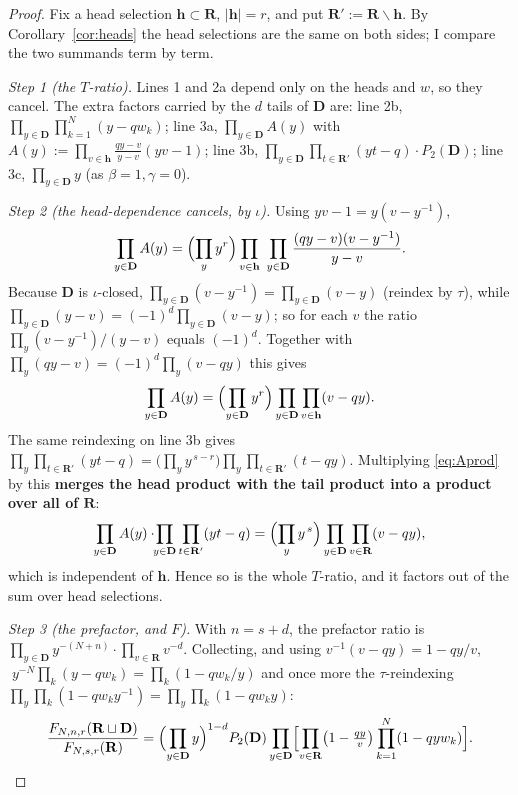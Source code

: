 \documentclass[11pt]{article}
\theoremstyle{definition}
\newcommand{\bD}{\mathbf{D}}
\newcommand{\bR}{\mathbf{R}}
\newcommand{\sm}{\smallsetminus}
\begin{document}
\begin{proof}
Fix a head selection $\mathbf h\subset\bR$, $|\mathbf h|=r$, and put
$\bR':=\bR\sm\mathbf h$.  By Corollary~\ref{cor:heads} the head selections are the
same on both sides; I compare the two summands term by term.

\emph{Step 1 (the $T$-ratio).}  Lines 1 and 2a depend only on the heads and $w$,
so they cancel.  The extra factors carried by the $d$ tails of $\bD$ are:
line 2b, $\prod_{y\in\bD}\prod_{k=1}^{N}(y-qw_k)$;
line 3a, $\prod_{y\in\bD}A(y)$ with
$A(y):=\prod_{v\in\mathbf h}\frac{qy-v}{y-v}(yv-1)$;
line 3b, $\prod_{y\in\bD}\prod_{t\in\bR'}(yt-q)\cdot P_2(\bD)$;
line 3c, $\prod_{y\in\bD}y$ (as $\beta=1,\gamma=0$).

\emph{Step 2 (the head-dependence cancels, by $\iota$).}  Using
$yv-1=y(v-y^{-1})$,
\[
  \prod_{y\in\bD}A(y)
  =\Bigl(\prod_{y}y^{r}\Bigr)
   \prod_{v\in\mathbf h}\ \prod_{y\in\bD}\frac{(qy-v)(v-y^{-1})}{y-v}.
\]
Because $\bD$ is $\iota$-closed, $\prod_{y\in\bD}(v-y^{-1})
=\prod_{y\in\bD}(v-y)$ (reindex by $\tau$), while
$\prod_{y\in\bD}(y-v)=(-1)^{d}\prod_{y\in\bD}(v-y)$; so for each $v$ the ratio
$\prod_y(v-y^{-1})/(y-v)$ equals $(-1)^{d}$.  Together with
$\prod_y(qy-v)=(-1)^{d}\prod_y(v-qy)$ this gives
\begin{equation}\label{eq:Aprod}
  \prod_{y\in\bD}A(y)
  =\Bigl(\prod_{y\in\bD}y^{r}\Bigr)\prod_{y\in\bD}\prod_{v\in\mathbf h}(v-qy).
\end{equation}
The same reindexing on line 3b gives
$\prod_{y}\prod_{t\in\bR'}(yt-q)
 =\bigl(\prod_y y^{\,s-r}\bigr)\prod_{y}\prod_{t\in\bR'}(t-qy)$.
Multiplying \eqref{eq:Aprod} by this \textbf{merges the head product with the
tail product into a product over all of $\bR$}:
\[
  \prod_{y\in\bD}A(y)\cdot\!\!\prod_{y\in\bD}\prod_{t\in\bR'}(yt-q)
  =\Bigl(\prod_{y}y^{\,s}\Bigr)\prod_{y\in\bD}\prod_{v\in\bR}(v-qy),
\]
which is independent of $\mathbf h$.  Hence so is the whole $T$-ratio, and it
factors out of the sum over head selections.

\emph{Step 3 (the prefactor, and $F$).}  With $n=s+d$, the prefactor ratio is
$\prod_{y\in\bD}y^{-(N+n)}\cdot\prod_{v\in\bR}v^{-d}$.  Collecting, and using
$v^{-1}(v-qy)=1-qy/v$, $\;y^{-N}\prod_k(y-qw_k)=\prod_k(1-qw_k/y)$ and once more
the $\tau$-reindexing $\prod_{y}\prod_k(1-qw_ky^{-1})=\prod_y\prod_k(1-qw_ky)$:
\begin{equation}\label{eq:Fratio}
  \frac{F_{N,n,r}(\bR\sqcup\bD)}{F_{N,s,r}(\bR)}
  =\Bigl(\prod_{y\in\bD}y\Bigr)^{1-d} P_2(\bD)
   \prod_{y\in\bD}\Bigl[\prod_{v\in\bR}\bigl(1-\tfrac{qy}{v}\bigr)
                        \prod_{k=1}^{N}(1-qyw_k)\Bigr].
\end{equation}


\end{proof}
\end{document}
